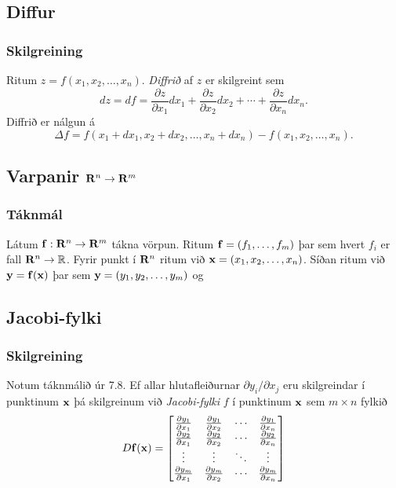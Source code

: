 \subsection{Diffur} 

\subsubsection{Skilgreining }
  Ritum $z=f(x_1, x_2, \ldots, x_n)$.  {\em
  Diffrið} af $z$ er skilgreint sem 
$$dz=df=\frac{\partial z}{\partial x_1}dx_1
+\frac{\partial z}{\partial x_2}dx_2
+\cdots+\frac{\partial z}{\partial x_n}dx_n.$$
Diffrið er nálgun á 
$$\Delta f=f(x_1+dx_1, x_2+dx_2,\ldots,
x_n+dx_n)-f(x_1,x_2,\ldots,x_n).$$




\subsection{Varpanir $\mbox{${\bf R}^n$}\rightarrow\mbox{${\bf R}^m$}$} 
\subsubsection{Táknmál }
Látum $\mbox{${\bf f}$}:\mbox{${\bf R}^n$}\rightarrow\mbox{${\bf R}^m$}$ tákna vörpun.
Ritum $\mbox{${\bf f}$}=(f_1,\ldots,f_m)$ þar sem hvert $f_i$ er fall
$\mbox{${\bf R}^n$}\rightarrow{\mathbb R}$.  Fyrir punkt í $\mbox{${\bf R}^n$}$ ritum við
$\mbox{${\bf x}$}=(x_1,x_2,\ldots,x_n)$.  Síðan ritum við $\mbox{${\bf y}$}=\mbox{${\bf f}$}(\mbox{${\bf x}$})$ þar sem 
$\mbox{${\bf y}$}=(y_1,y_2,\ldots,y_m)$ og 




\subsection{Jacobi-fylki} 
 \subsubsection{Skilgreining }
 Notum táknmálið úr 7.8.
Ef allar hlutafleiðurnar $\partial
y_i/\partial x_j$ eru skilgreindar í punktinum $\mbox{${\bf x}$}$ þá skilgreinum
við {\em Jacobi-fylki} $f$ í punktinum $\mbox{${\bf x}$}$ sem $m\times n$ fylkið
$$D\mbox{${\bf f}$}(\mbox{${\bf x}$})=\begin{bmatrix}
\frac{\partial y_1}{\partial x_1}&\frac{\partial y_1}{\partial x_2}&
\cdots&\frac{\partial y_1}{\partial x_n}\\
\frac{\partial y_2}{\partial x_1}&\frac{\partial y_2}{\partial x_2}&
\cdots&\frac{\partial y_2}{\partial x_n}\\
\vdots&\vdots&\ddots&\vdots\\
\frac{\partial y_m}{\partial x_1}&\frac{\partial y_m}{\partial x_2}&
\cdots&\frac{\partial y_m}{\partial x_n}
\end{bmatrix}$$



